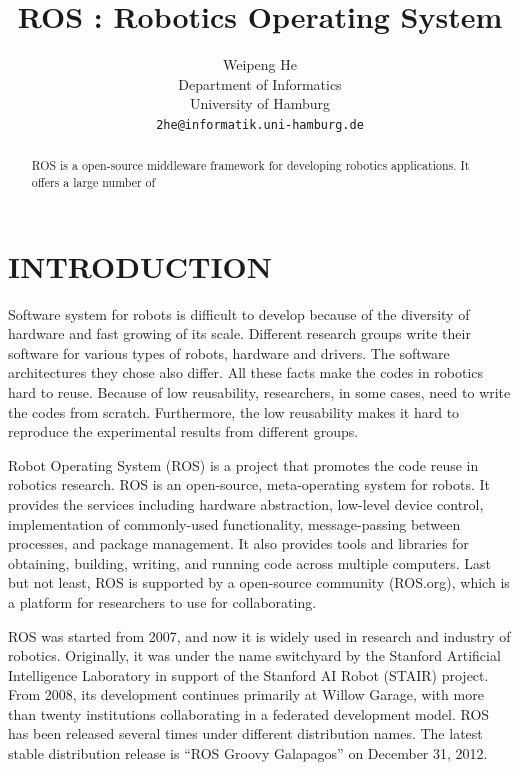 \documentclass[a4paper, 11pt, conference]{ieeeconf}       %
\title{\LARGE \bf
  ROS : Robotics Operating System
}
\author{
  Weipeng He
\\ Department of Informatics\\ University of Hamburg \\ {\tt\small 2he@informatik.uni-hamburg.de}
}
\begin{document}
\maketitle
\thispagestyle{empty}
\pagestyle{empty}

\begin{abstract}
  ROS is a open-source middleware framework for developing robotics applications. It offers a large number of 
\end{abstract}


\section{INTRODUCTION}

Software system for robots is difficult to develop because of the diversity of hardware and fast growing of its scale. Different research groups write their software for various types of robots, hardware and drivers. The software architectures they chose also differ. All these facts make the codes in robotics hard to reuse. Because of low reusability, researchers, in some cases, need to write the codes from scratch. Furthermore, the low reusability makes it hard to reproduce the experimental results from different groups.

Robot Operating System (ROS) is a project that promotes the code reuse in robotics research\cite{quigley_ros:_2009}. ROS is an open-source, meta-operating system for robots. It provides the services including hardware abstraction, low-level device control, implementation of commonly-used functionality, message-passing between processes, and package management. It also provides tools and libraries for obtaining, building, writing, and running code across multiple computers. Last but not least, ROS is supported by a open-source community (ROS.org), which is a platform for researchers to use for collaborating.

ROS was started from 2007, and now it is widely used in research and industry of robotics. Originally, it was under the name switchyard by the Stanford Artificial Intelligence Laboratory in support of the Stanford AI Robot (STAIR) project. From 2008, its development continues primarily at Willow Garage, with more than twenty institutions collaborating in a federated development model. ROS has been released several times under different distribution names. The latest stable distribution release is ``ROS Groovy Galapagos'' on December 31, 2012\cite{_documentation_2013}.
\end{document}
